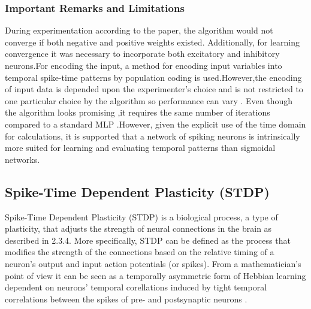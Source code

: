 \documentclass[12pt]{report}
\begin{document}
\subsubsection{Important Remarks and Limitations}
During experimentation according to the paper, the algorithm would not converge if both negative and positive weights existed. Additionally, for learning convergence it was necessary to incorporate both excitatory and inhibitory neurons.For encoding the input, a method for encoding input variables into temporal spike-time patterns by population coding is used.However,the encoding of input data is depended upon the experimenter's choice and is not restricted to one particular choice by the algorithm so performance can vary . Even though the algorithm looks promising ,it requires the same number of iterations compared to a standard MLP .However, given the explicit use of the time domain for calculations, it is supported that a network of spiking neurons is intrinsically more suited for learning and evaluating temporal patterns than sigmoidal networks.
\subsection{Spike-Time Dependent Plasticity (STDP)}
Spike-Time Dependent Plasticity (STDP)  is a biological process, a type of plasticity, that adjusts the strength of neural connections in the brain as described in 2.3.4. More specifically, STDP can be defined as the process that modifies the strength of the connections based on the relative timing of a neuron's output and input action potentials (or spikes). From a mathematician's point of view it can be seen as a temporally asymmetric form of Hebbian learning dependent on neurons' temporal corellations  induced by tight temporal correlations between the spikes of pre- and postsynaptic neurons \cite{stdp2010} . 
\end{document}

